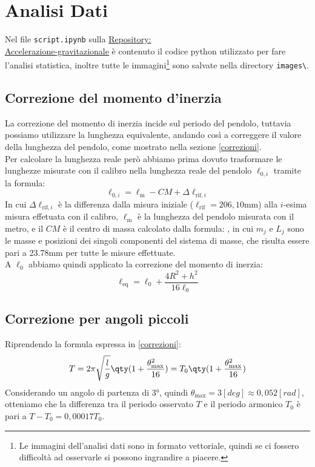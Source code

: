 \section{Analisi Dati}\label{analisi dati}
Nel file \verb|script.ipynb| sulla \href{https://github.com/Mattia04/Accelerazione-gravitazionale/tree/main}{Repository:\\Accelerazione-gravitazionale} è contenuto il codice python utilizzato per fare l'analisi statistica, inoltre tutte le immagini\footnote{Le immagini dell'analisi dati sono in formato vettoriale, quindi se ci fossero difficoltà ad osservarle si possono ingrandire a piacere.} sono salvate nella directory \verb|images\|.\\

\subsection*{Correzione del momento d'inerzia}
La correzione del momento di inerzia incide sul periodo del pendolo, tuttavia possiamo utilizzare la lunghezza equivalente, andando così a correggere il valore della lunghezza del pendolo, come mostrato nella sezione \ref{correzioni}.\\
Per calcolare la lunghezza reale però abbiamo prima dovuto trasformare le lunghezze misurate con il calibro nella lunghezza reale del pendolo $\ell_{0,i}$ tramite la formula:
$$\ell_{0,i} = \ell_\text{m} - CM + \Delta\ell_{\text{rif},i}$$
In cui $\Delta\ell_{\text{rif},i}$ è la differenza dalla misura  iniziale ($\ell_\text{rif} = 206,10$mm) alla $i$-esima misura effetuata con il calibro, $\ell_\text{m}$ è la lunghezza del pendolo misurata con il metro, e il $CM$ è il centro di massa calcolato dalla formula: , in cui $m_j$ e $L_j$ sono le masse e posizioni dei singoli componenti del sistema di masse, che risulta essere pari a 23.78mm per tutte le misure effettuate.\\
A $\ell_{0}$ abbiamo quindi applicato la correzione del momento di inerzia: $$\ell_\text{eq} = \ell_0 + \frac{4R^2 + h^2}{16\ell_0}$$

\subsection*{Correzione per angoli piccoli}\label{correzione angoli piccoli}
Riprendendo la formula espressa in \ref{correzioni}:
$$ T = 2\pi \sqrt{\frac{l}{g}}\qty(1+\frac{\theta_\text{max}^2}{16}) = T_0 \qty(1+\frac{\theta_\text{max}^2}{16})$$
Considerando un angolo di partenza di 3°, quindi $\theta_\text{max} = 3[deg] \approx 0,052[rad]$, otteniamo che la differenza tra il periodo osservato $T$ e il periodo armonico $T_0$ è pari a $T- T_0 = 0,00017T_0$.\\

